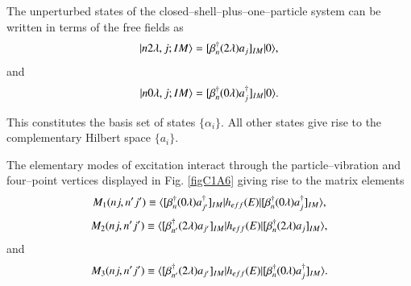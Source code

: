 The unperturbed states of the closed--shell--plus--one--particle system can be written in terms of the free fields as 
  \begin{align}\label{eqC1A81} 
   |{n2\lambda,j;IM} \rangle=[\beta^\dagger_n(2\lambda)a_j]_{IM}|{0} \rangle,
    \end{align}  
and 
  \begin{align}\label{eqC1A82} 
   |{n0\lambda,j;IM} \rangle=[\beta^\dagger_n(0\lambda)a^\dagger_j]_{IM}|{0} \rangle.
    \end{align}   


This constitutes the basis set of states $\{\alpha_i\}$. All other states give rise to the complementary Hilbert space $\{a_i\}$. 


The elementary modes of excitation interact through the particle--vibration and four--point vertices displayed in Fig. \ref{figC1A6} giving rise to the matrix elements 
  \begin{align}\label{eqC1A83} 
   M_1(nj,n'j')\equiv \langle {[\beta^\dagger_n(0\lambda)a^\dagger_{j'}]_{IM}|h_{eff}(E)|[\beta^\dagger_n(0\lambda)a^\dagger_j]_{IM}} \rangle,
    \end{align}   
  \begin{align}\label{eqC1A84} 
   M_2(nj,n'j')\equiv \langle {[\beta^\dagger_{n'}(2\lambda)a_{j'}]_{IM}|h_{eff}(E)|[\beta^\dagger_n(2\lambda)a_j]_{IM}} \rangle,
    \end{align}    
and 
  \begin{align}\label{eqC1A85} 
   M_3(nj,n'j')\equiv \langle {[\beta^\dagger_{n'}(2\lambda)a_{j'}]_{IM}|h_{eff}(E)|[\beta^\dagger_{n}(0\lambda)a^\dagger_j]_{IM}} \rangle.
    \end{align}   
